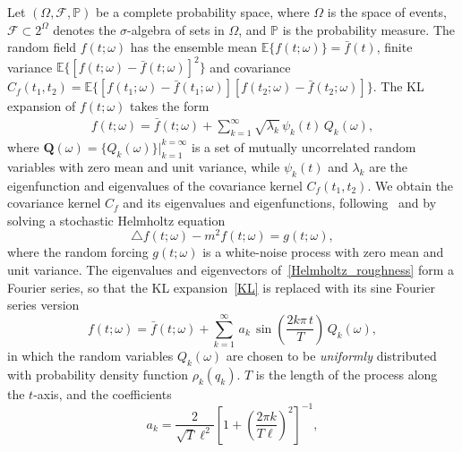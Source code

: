 Let $(\Omega, \mathcal{F},\mathbb{P})$ be a complete probability space, where $\Omega$ is the space of events, $\mathcal{F} \subset 2^{\Omega}$ denotes the $\sigma$-algebra of sets in $\Omega$, and $\mathbb{P}$ is the probability measure. The random field $f(t;\omega)$ has the ensemble mean $\mathbb{E}\{f(t; \omega)\} = \bar{f}(t)$, finite variance $\mathbb{E}\{ [f(t; \omega) - \bar{f}(t; \omega)]^2\}$ and covariance $C_f( t_1, t_2) = \mathbb{E}\{ [f(t_1; \omega) - \bar{f}(t_1; \omega)] [f(t_2; \omega) - \bar{f}(t_2; \omega)]\}$.  The KL expansion of $f(t; \omega)$ takes the form  
%
%
\begin{align}
\label{KL}
f(t;\omega) = \bar{f}(t; \omega) + \sum_{k=1}^\infty \sqrt{\lambda_k} \, \psi_k(t) \, Q_k(\omega),
%
\end{align}
%
where $\boldsymbol Q(\omega) = \lbrace Q_k(\omega) \rbrace \big|_{k=1}^{k=\infty}$ is a set of mutually uncorrelated random variables with zero mean and unit variance, while $\psi_k(t)$ and $\lambda_k$ are the eigenfunction and eigenvalues of the covariance kernel $C_f(  t_1, t_2 )$. 
%
We obtain the covariance kernel $C_f$ and its eigenvalues and eigenfunctions, following~\cite{Su06} and by solving a stochastic Helmholtz equation
%
\begin{equation}
%
\label{Helmholtz_roughness}
\triangle f(t; \omega) - m^2 f(t; \omega) = g( t;\omega),
%
\end{equation}
%
where the random forcing $g(t;\omega)$ is a white-noise process with zero mean and unit variance. The eigenvalues and eigenvectors of~\eqref{Helmholtz_roughness} form a Fourier series, so that the KL expansion~\eqref{KL} is replaced with its sine Fourier series version
%
\begin{equation}
%
\label{Fourier_KL}
f(t;\omega) =\bar{f}(t; \omega) +  \sum_{k=1}^\infty \, a_k \, \sin\left(\frac{2 k \pi \, t}{T}\right) \, Q_k(\omega),
%
\end{equation}
%
in which the random variables $Q_k(\omega)$ are chosen to be \textit{uniformly} distributed with probability density function $\rho_k(q_k)$. $T$ is the length of the process along the $t$-axis, and the coefficients
%
\begin{equation}
%
\label{a_k}
a_k =   \frac{2}{\sqrt T \ell^2} \left[ 1 + \left(\frac{2\pi k}{T\ell} \right)^2 \right]^{-1},
%
\end{equation}
%
